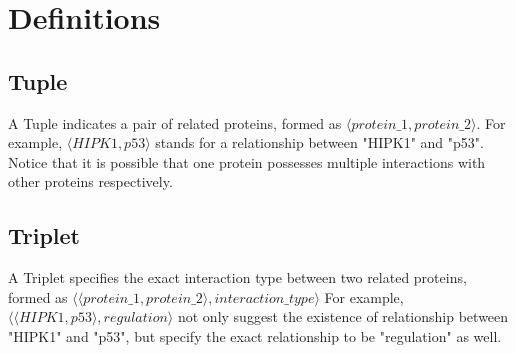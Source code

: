 \section{Definitions}

\subsection{Tuple}
A Tuple indicates a pair of related proteins, formed as $\langle protein\_1,protein\_2\rangle$. For example, $\langle HIPK1,p53\rangle$ stands for a relationship between "HIPK1" and "p53".
Notice that it is possible that one protein possesses multiple interactions with other proteins respectively.

\subsection{Triplet}
A Triplet specifies the exact interaction type between two related proteins, formed as $\langle\langle protein\_1,protein\_2\rangle,interaction\_type\rangle$ For example, $\langle\langle HIPK1,p53\rangle, regulation\rangle$ not only suggest the existence of relationship between "HIPK1" and "p53", but specify the exact relationship to be "regulation" as well.
